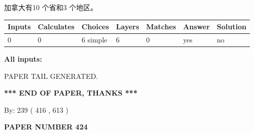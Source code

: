 \documentclass{ctexart}
\begin{document}
 
加拿大有10 个省和3 个地区。
 
 
\noindent{}
 
 
   
   
   
   
\noindent\begin{tabular}{|l|l|l|l|l|l|l|}
 \hline
Inputs & Calculates & Choices & Layers & Matches & Answer & Solution \\ \hline
 0  & 
 0  & 
 6
  simple  
  & 
 6  & 
 0  & 
  yes & 
  no 
  \\ \hline
 \end{tabular}
   
   
   
   
\noindent{}
   
   
   
   
\noindent\vspace{0.1in}\hspace{-0.08in} {\textbf{\Large{All inputs: }}}
   
   
   
   
   
   
 \vspace{0.2in}
 
   
   
\vspace{2.0in} PAPER TAIL GENERATED.
   
   
   
   
\vspace{1.0in} 
{\textbf{\large{ *** END OF PAPER, THANKS *** }}} 
   
   
\hspace{1.0in} By: 
 239 ( 416 ,  613 )
   
   
   
   
\newpage 
\setcounter{page}{ 
   424001 } 
   
   
   
   
 {\textbf{ \Large{ PAPER NUMBER  424  }}}
   
   
\vspace{0.2in}
   
   
   
   
   
   
   
\end{document}
